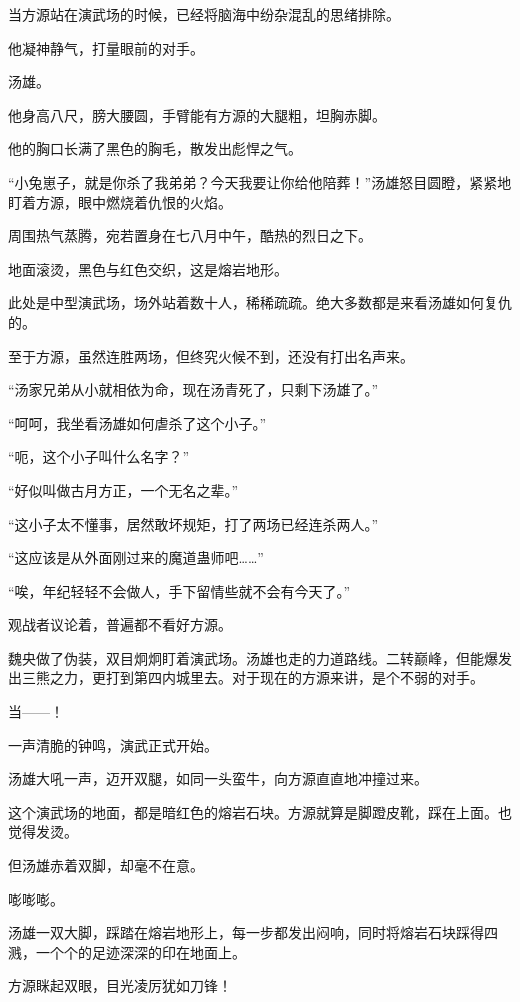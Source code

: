 
\begin{this_body}

当方源站在演武场的时候，已经将脑海中纷杂混乱的思绪排除。

他凝神静气，打量眼前的对手。

汤雄。

他身高八尺，膀大腰圆，手臂能有方源的大腿粗，坦胸赤脚。

他的胸口长满了黑色的胸毛，散发出彪悍之气。

“小兔崽子，就是你杀了我弟弟？今天我要让你给他陪葬！”汤雄怒目圆瞪，紧紧地盯着方源，眼中燃烧着仇恨的火焰。

周围热气蒸腾，宛若置身在七八月中午，酷热的烈日之下。

地面滚烫，黑色与红色交织，这是熔岩地形。

此处是中型演武场，场外站着数十人，稀稀疏疏。绝大多数都是来看汤雄如何复仇的。

至于方源，虽然连胜两场，但终究火候不到，还没有打出名声来。

“汤家兄弟从小就相依为命，现在汤青死了，只剩下汤雄了。”

“呵呵，我坐看汤雄如何虐杀了这个小子。”

“呃，这个小子叫什么名字？”

“好似叫做古月方正，一个无名之辈。”

“这小子太不懂事，居然敢坏规矩，打了两场已经连杀两人。”

“这应该是从外面刚过来的魔道蛊师吧……”

“唉，年纪轻轻不会做人，手下留情些就不会有今天了。”

观战者议论着，普遍都不看好方源。

魏央做了伪装，双目炯炯盯着演武场。汤雄也走的力道路线。二转巅峰，但能爆发出三熊之力，更打到第四内城里去。对于现在的方源来讲，是个不弱的对手。

当——！

一声清脆的钟鸣，演武正式开始。

汤雄大吼一声，迈开双腿，如同一头蛮牛，向方源直直地冲撞过来。

这个演武场的地面，都是暗红色的熔岩石块。方源就算是脚蹬皮靴，踩在上面。也觉得发烫。

但汤雄赤着双脚，却毫不在意。

嘭嘭嘭。

汤雄一双大脚，踩踏在熔岩地形上，每一步都发出闷响，同时将熔岩石块踩得四溅，一个个的足迹深深的印在地面上。

方源眯起双眼，目光凌厉犹如刀锋！


\end{this_body}
